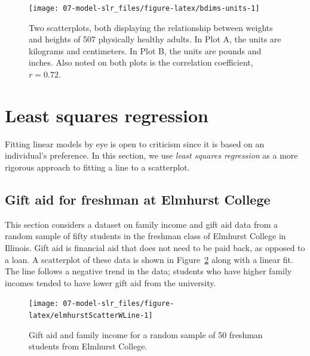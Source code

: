 \documentclass[
  10pt,
  openany]{book}
\begin{document}
\begin{figure}[h]

{\centering \texttt{[image: 07-model-slr\_files/figure-latex/bdims-units-1]} 

}

\caption{Two scatterplots, both displaying the relationship between weights and heights of 507 physically healthy adults. In Plot A, the units are kilograms and centimeters. In Plot B, the units are pounds and inches. Also noted on both plots is the correlation coefficient, $r = 0.72.$}\label{fig:bdims-units}
\end{figure}

\hypertarget{least-squares-regression}{%
\section{Least squares regression}\label{least-squares-regression}}

Fitting linear models by eye is open to criticism since it is based on an individual's preference.
In this section, we use \emph{least squares regression} as a more rigorous approach to fitting a line to a scatterplot.

\hypertarget{gift-aid-for-freshman-at-elmhurst-college}{%
\subsection{Gift aid for freshman at Elmhurst College}\label{gift-aid-for-freshman-at-elmhurst-college}}

This section considers a dataset on family income and gift aid data from a random sample of fifty students in the freshman class of Elmhurst College in Illinois.
Gift aid is financial aid that does not need to be paid back, as opposed to a loan.
A scatterplot of these data is shown in Figure~\ref{fig:elmhurstScatterWLine} along with a linear fit.
The line follows a negative trend in the data; students who have higher family incomes tended to have lower gift aid from the university.

\begin{figure}[h]

{\centering \texttt{[image: 07-model-slr\_files/figure-latex/elmhurstScatterWLine-1]} 

}

\caption{Gift aid and family income for a random sample of 50 freshman students from Elmhurst College.}\label{fig:elmhurstScatterWLine}
\end{figure}
\end{document}
